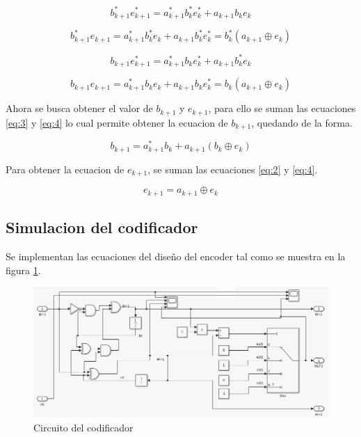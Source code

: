\begin{equation}
    \label{eq:1}
    b_{k+1}^*e_{k+1}^*=a_{k+1}^*b_k^*e_k^*+a_{k+1}b_ke_k
\end{equation}

\begin{equation}
    \label{eq:2}
    b_{k+1}^*e_{k+1}=a_{k+1}^*b_k^*e_k+a_{k+1}b_k^*e_k^*=b_k^*(a_{k+1}\oplus e_k)
\end{equation}

\begin{equation}
    \label{eq:3}
    b_{k+1}e_{k+1}^*=a_{k+1}^*b_k e_k^*+a_{k+1}b_k^*e_k
\end{equation}

\begin{equation}
    \label{eq:4}
    b_{k+1}e_{k+1}=a_{k+1}^*b_k e_k+a_{k+1}b_k e_k^*=b_k(a_{k+1}\oplus e_k)
\end{equation}

Ahora se busca obtener el valor de $b_{k+1}$ y $e_{k+1}$, para ello se suman las ecuaciones \ref{eq:3} y \ref{eq:4} lo cual permite obtener la ecuacion de $b_{k+1}$, quedando de la forma.

\begin{equation*}
    b_{k+1}=a_{k+1}^*b_k+a_{k+1}(b_k\oplus e_k)
\end{equation*}

Para obtener la ecuacion de $e_{k+1}$, se suman las ecuaciones \ref{eq:2} y \ref{eq:4}.

\begin{equation*}
    e_{k+1}=a_{k+1}\oplus e_k
\end{equation*}

\subsection{Simulacion del codificador}

Se implementan las ecuaciones del diseño del encoder tal como se muestra en la figura \ref{coder}.

\begin{figure}[H]
    \centering
    \includegraphics[width=1\textwidth]{laboratorioMLT3/imagenes/coder.PNG}
    \caption{\label{coder}Circuito del codificador}
\end{figure}

